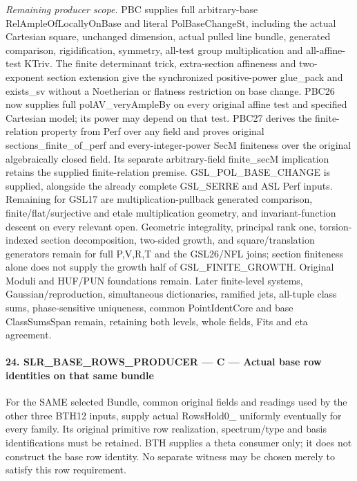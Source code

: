\emph{Remaining producer scope.} PBC supplies full arbitrary-base RelAmpleOfLocallyOnBase and literal PolBaseChangeSt, including the actual Cartesian square, unchanged dimension, actual pulled line bundle, generated comparison, rigidification, symmetry, all-test group multiplication and all-affine-test KTriv. The finite determinant trick, extra-section affineness and two-exponent section extension give the synchronized positive-power glue\_\allowbreak pack and exists\_\allowbreak sv without a Noetherian or flatness restriction on base change. PBC26 now supplies full polAV\_\allowbreak veryAmpleBy on every original affine test and specified Cartesian model; its power may depend on that test. PBC27 derives the finite-relation property from Perf over any field and proves original sections\_\allowbreak finite\_\allowbreak of\_\allowbreak perf and every-integer-power SecM finiteness over the original algebraically closed field. Its separate arbitrary-field finite\_\allowbreak secM implication retains the supplied finite-relation premise. GSL\_\allowbreak POL\_\allowbreak BASE\_\allowbreak CHANGE is supplied, alongside the already complete GSL\_\allowbreak SERRE and ASL Perf inputs. Remaining for GSL17 are multiplication-pullback generated comparison, finite/flat/surjective and etale multiplication geometry, and invariant-function descent on every relevant open. Geometric integrality, principal rank one, torsion-indexed section decomposition, two-sided growth, and square/translation generators remain for full P,V,R,T and the GSL26/NFL joins; section finiteness alone does not supply the growth half of GSL\_\allowbreak FINITE\_\allowbreak GROWTH. Original Moduli and HUF/PUN foundations remain. Later finite-level systems, Gaussian/reproduction, simultaneous dictionaries, ramified jets, all-tuple class sums, phase-sensitive uniqueness, common PointIdentCore and base ClassSumsSpan remain, retaining both levels, whole fields, Fits and eta agreement.



\paragraph{24. SLR\_\allowbreak BASE\_\allowbreak ROWS\_\allowbreak PRODUCER — C — Actual base row identities on that same bundle}

For the SAME selected Bundle, common original fields and readings used by the other three BTH12 inputs, supply actual RowsHold0\_ uniformly eventually for every family. Its original primitive row realization, spectrum/type and basis identifications must be retained. BTH supplies a theta consumer only; it does not construct the base row identity. No separate witness may be chosen merely to satisfy this row requirement.


